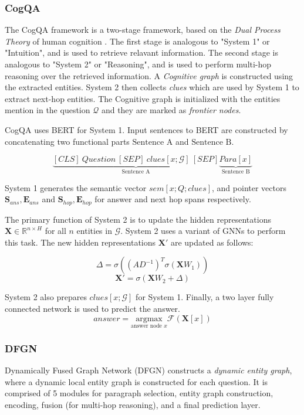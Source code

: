 \documentclass[sigplan,screen]{acmart}
\begin{document}
\subsubsection{CogQA}
The CogQA framework \cite{RN118} is a two-stage framework, based on the \emph{Dual Process Theory} of human cognition \cite{RN137}.
The first stage is analogous to "System 1" or "Intuition", and is used to retrieve relavant information. The second stage is analogous to
"System 2" or "Reasoning", and is used to perform multi-hop reasoning over the retrieved information. A \emph{Cognitive graph} is constructed
using the extracted entities. System 2 then collects \emph{clues} which are used by System 1 to extract next-hop entities.
The Cognitive graph is initialized with the entities mention in the question $\mathcal{Q}$ and they are marked as \emph{frontier nodes}.

CogQA uses BERT \cite{RN153} for System 1. Input sentences to BERT are constructed by concatenating two functional parts 
$\text{Sentence A}$ and $\text{Sentence B}$.

$$
\underbrace{{[CLS]\: Question \: [SEP]\: clues[x; \mathcal{G}]\: [SEP]}}_{\text{Sentence A}} \underbrace{{Para[x]}}_{\text{Sentence B}}
$$

System 1 generates the semantic vector $sem[x; Q; clues]$, and pointer vectors 
$\boldsymbol{S}_{ans} , \boldsymbol{E}_{ans} $ and $\boldsymbol{S}_{hop} , \boldsymbol{E}_{hop} $ for answer and next hop spans respectively.

The primary function of System 2 is to update the hidden representations $\boldsymbol{X} \in \mathbb{R}^{n \times H}$ for all $n$ entities in $\mathcal{G}$.
System 2 uses a variant of GNNs \cite{RN2} to perform this task. The new hidden representations $\boldsymbol{X'}$ are updated as follows:

$$
\Delta = \sigma((AD^{-1})^T \sigma (\boldsymbol{X}W_1))
$$
$$
\boldsymbol{X'} = \sigma(\boldsymbol{X}W_2 + \Delta)
$$

System 2 also prepares $clues[x; \mathcal{G}]$ for System 1. Finally, a two layer fully connected network is used to predict the answer.
$$
answer = \underset{\text{answer node }x}{\mathrm{argmax}}  \mathcal{F}(\boldsymbol{X}[x])
$$

\subsubsection{DFGN}
Dynamically Fused Graph Network (DFGN) \cite{RN122} constructs a \emph{dynamic entity graph}, where a dynamic local entity graph is 
constructed for each question. It is comprised of 5 modules for paragraph selection, entity graph construction, encoding, fusion (for multi-hop reasoning),
and a final prediction layer.
\end{document}
